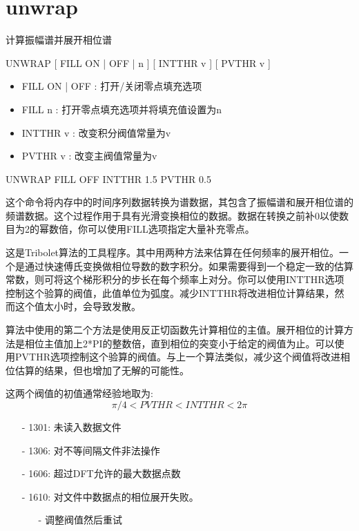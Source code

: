 \section{unwrap}
\label{cmd:unwrap}

计算振幅谱并展开相位谱

UNWRAP [ FILL ON | OFF | n ] [ INTTHR v ] [ PVTHR v ]

\begin{itemize}
\item FILL ON | OFF : 打开/关闭零点填充选项 
\item FILL n : 打开零点填充选项并将填充值设置为n 
\item INTTHR v : 改变积分阀值常量为v 
\item PVTHR v : 改变主阀值常量为v 
\end{itemize}

UNWRAP FILL OFF INTTHR 1.5 PVTHR 0.5

这个命令将内存中的时间序列数据转换为谱数据，其包含了振幅谱和展开相位谱的频谱数据。这个过程作用于具有光滑变换相位的数据。数据在转换之前补0以使数目为2的幂数倍，你可以使用FILL选项指定大量补充零点。

这是Tribolet算法的工具程序。其中用两种方法来估算在任何频率的展开相位。一个是通过快速傅氏变换做相位导数的数字积分。如果需要得到一个稳定一致的估算常数，则可将这个梯形积分的步长在每个频率上对分。你可以使用INTTHR选项控制这个验算的阀值，此值单位为弧度。减少INTTHR将改进相位计算结果，然而这个值太小时，会导致发散。

算法中使用的第二个方法是使用反正切函数先计算相位的主值。展开相位的计算方法是相位主值加上2*PI的整数倍，直到相位的突变小于给定的阀值为止。可以使用PVTHR选项控制这个验算的阀值。与上一个算法类似，减少这个阀值将改进相位估算的结果，但也增加了无解的可能性。

这两个阀值的初值通常经验地取为:
\[ \pi/4 < PVTHR < INTTHR < 2\pi \]

\begin{itemize}
\item[-]1301: 未读入数据文件
\item[-]1306: 对不等间隔文件非法操作
\item[-]1606: 超过DFT允许的最大数据点数
\end{itemize}

\begin{itemize}
\item[-]1610: 对文件中数据点的相位展开失败。
	\begin{itemize}
	\item[-]调整阀值然后重试
	\end{itemize}
\end{itemize}

